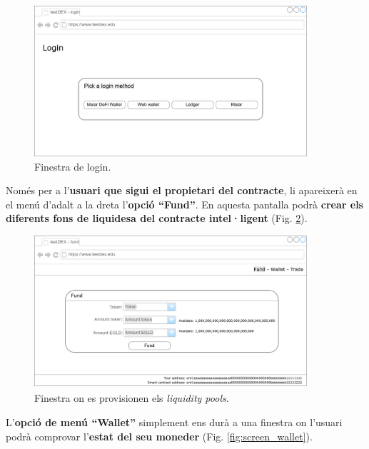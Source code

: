 \documentclass[11pt,a4paper]{article}
\begin{document}
\begin{figure}[h]
\includegraphics[width=0.9\textwidth]{screen_login.png}
\centering
\caption{Finestra de login.}\label{fig:screen_login}
\end{figure} 

Només per a l'\textbf{usuari que sigui el propietari del contracte}, li apareixerà en el menú d'adalt a la dreta l'\textbf{opció ``Fund''}. En aquesta pantalla podrà \textbf{crear els diferents fons de liquidesa del contracte intel·ligent} (Fig. \ref{fig:screen_fund}).

\begin{figure}[h]
\includegraphics[width=0.9\textwidth]{screen_fund.png}
\centering
\caption{Finestra on es provisionen els \textit{liquidity pools}.}\label{fig:screen_fund}
\end{figure} 

L'\textbf{opció de menú ``Wallet''} simplement ens durà a una finestra on l'usuari podrà comprovar l'\textbf{estat del seu moneder} (Fig. \ref{fig:screen_wallet}).
\end{document}
